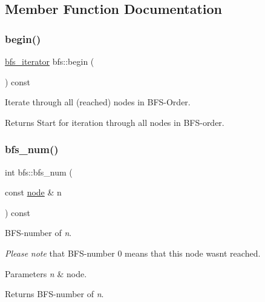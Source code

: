 \subsection{Member Function Documentation}
\mbox{\label{classbfs_aff214e6d33f7f2bbd899cf335540def9}} 
\subsubsection{\texorpdfstring{begin()}{begin()}}
{\footnotesize\ttfamily \mbox{\hyperlink{classbfs_acafce54954100cc7bc9f80eb318a7bee}{bfs\+\_\+iterator}} bfs\+::begin (\begin{DoxyParamCaption}{ }\end{DoxyParamCaption}) const\hspace{0.3cm}{\ttfamily [inline]}}



Iterate through all (reached) nodes in B\+F\+S-\/\+Order. 

\begin{DoxyReturn}{Returns}
Start for iteration through all nodes in B\+F\+S-\/order. 
\end{DoxyReturn}
\mbox{\label{classbfs_a6205cc191bc0bedf1ff9d74af0925735}} 
\subsubsection{\texorpdfstring{bfs\+\_\+num()}{bfs\_num()}}
{\footnotesize\ttfamily int bfs\+::bfs\+\_\+num (\begin{DoxyParamCaption}\item[{const \mbox{\hyperlink{classnode}{node}} \&}]{n }\end{DoxyParamCaption}) const\hspace{0.3cm}{\ttfamily [inline]}}



B\+F\+S-\/number of {\itshape n}. 

{\itshape Please} {\itshape note} that B\+F\+S-\/number 0 means that this node wasn\textquotesingle{}t reached.


\begin{DoxyParams}{Parameters}
{\em n} & node. \\
\hline
\end{DoxyParams}
\begin{DoxyReturn}{Returns}
B\+F\+S-\/number of {\itshape n}. 
\end{DoxyReturn}
\mbox{\label{classbfs_a491515da4eb8efca0be4fef0df350a8e}} 
